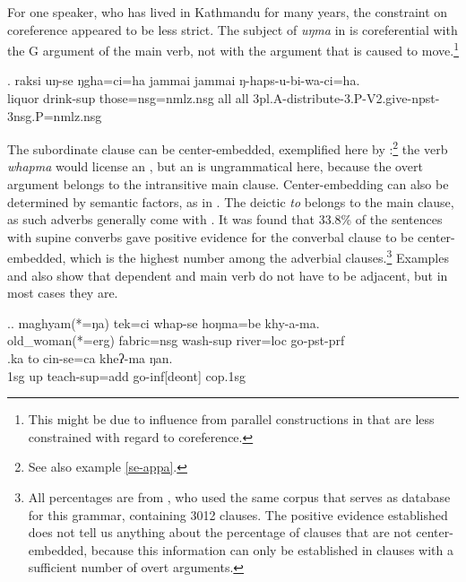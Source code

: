 For one speaker, who has lived  in Kathmandu for many years, the constraint on coreference appeared to be less strict. The subject of \emph{uŋma}  in \Next is coreferential with the G argument of the main verb, not with the argument that is caused to move.\footnote{This might be due to influence from parallel constructions in  that are less constrained with regard to coreference.}

		\exg.		raksi  uŋ-se          ŋgha=ci=ha            jammai jammai ŋ-haps-u-bi-wa-ci=ha.\\
	liquor   drink{\sc -sup} those{\sc =nsg=nmlz.nsg} all all {\sc 3pl.A-}distribute{\sc -3.P-V2.give-npst-3nsg.P=nmlz.nsg}\\
		
The subordinate clause can be center-embedded, exemplified here by \Next[a]:\footnote{See also example \ref{se-appa}.} the verb \emph{whapma} would license an , but an  is ungrammatical here, because the overt argument belongs to the intransitive main clause. Center-embedding can also be determined by semantic factors, as in \Next[b]. The deictic  \emph{to} belongs to the main clause, as such adverbs generally come with . It was found that 33.8\% of the sentences with supine converbs gave positive evidence for the converbal clause to be center-embedded, which is the highest number among the adverbial clauses.\footnote{All percentages are from \citep{Bierkandtetal_Scope}, who used the same corpus that serves as database for this grammar, containing 3012 clauses. The positive evidence established does not tell us anything about the percentage of clauses that are not center-embedded, because this information can only be established in clauses with a sufficient number of overt arguments.} Examples  \Last and  \Next also show that dependent and main verb do not have to be adjacent, but in most cases they are.
 		
\ex.\ag. maghyam(*=ŋa)   tek=ci        whap-se                hoŋma=be    khy-a-ma.\\
old\_woman(*=erg) fabric{\sc =nsg} wash{\sc -sup} river{\sc =loc} go{\sc [3sg]-pst-prf}\\
\bg.ka  to  cin-se=ca    kheʔ-ma   ŋan.\\
{\sc 1sg} up teach{\sc -sup=add} go{\sc -inf[deont]} {\sc cop.1sg}\\
		
